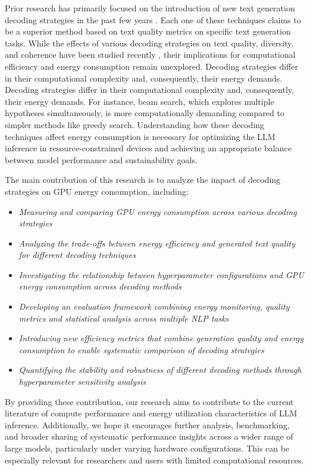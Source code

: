 Prior research has primarily focused on the introduction of new text generation decoding strategies in the past few years \cite{four,five,six,seven,eight}. Each one of these techniques claims to be a superior method based on text quality metrics on specific text generation tasks.  While the effects of various decoding strategies on text quality, diversity, and coherence have been studied recently \cite{one,two}, their implications for computational efficiency and energy consumption remain unexplored. Decoding strategies differ in their computational complexity and, consequently, their energy demands. Decoding strategies differ in their computational complexity and, consequently, their energy demands. For instance, beam search, which explores multiple hypotheses simultaneously, is more computationally demanding compared to simpler methods like greedy search. Understanding how these decoding techniques affect energy consumption is necessary for optimizing the LLM inference in resource-constrained devices and achieving an appropriate balance between model performance and sustainability goals. 

The main contribution of this research is to analyze the impact of decoding strategies on GPU energy consumption, including:

\begin{itemize}\itemsep0em 
\item \textit{Measuring and comparing GPU energy consumption across various decoding strategies}
\item \textit{Analyzing the trade-offs between energy efficiency and generated text quality for different decoding techniques}
\item \textit{Investigating the relationship between hyperparameter configurations and GPU energy consumption across decoding methods}
\item \textit{Developing an evaluation framework combining energy monitoring, quality metrics and statistical analysis across multiple NLP tasks}
\item \textit{Introducing new efficiency metrics that combine generation quality and energy consumption to enable systematic comparison of decoding strategies}
\item \textit{Quantifying the stability and robustness of different decoding methods through hyperparameter sensitivity analysis}
\end{itemize}

By providing these contribution, our research aims to contribute to the current literature of compute performance and energy utilization characteristics of LLM inference. Additionally, we hope it encourages further analysis, benchmarking, and broader sharing of systematic performance insights across a wider range of large models, particularly under varying hardware configurations. This can be especially relevant for researchers and users with limited computational resources. 